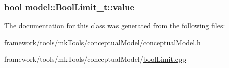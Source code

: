 \subsubsection[{\texorpdfstring{value}{value}}]{\setlength{\rightskip}{0pt plus 5cm}bool model\+::\+Bool\+Limit\+\_\+t\+::value\hspace{0.3cm}{\ttfamily [protected]}}\hypertarget{classmodel_1_1_bool_limit__t_a6863665441b716a6d29ca00b75b49627}{}\label{classmodel_1_1_bool_limit__t_a6863665441b716a6d29ca00b75b49627}


The documentation for this class was generated from the following files\+:\begin{DoxyCompactItemize}
\item 
framework/tools/mk\+Tools/conceptual\+Model/\hyperlink{conceptual_model_8h}{conceptual\+Model.\+h}\item 
framework/tools/mk\+Tools/conceptual\+Model/\hyperlink{bool_limit_8cpp}{bool\+Limit.\+cpp}\end{DoxyCompactItemize}
